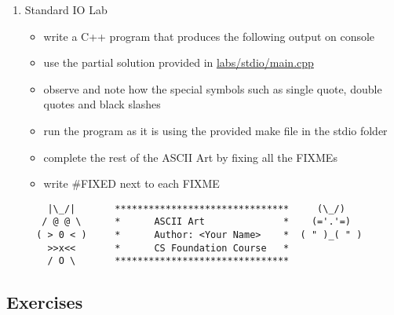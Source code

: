 \documentclass[11pt]{article}
\providecommand{\tightlist}{%
      \setlength{\itemsep}{0pt}\setlength{\parskip}{0pt}}
\begin{document}
\begin{enumerate}
\def\labelenumi{\arabic{enumi}.}
\tightlist
\item
  Standard IO Lab

  \begin{itemize}
  \tightlist
  \item
    write a C++ program that produces the following output on console
  \item
    use the partial solution provided in \url{labs/stdio/main.cpp}
  \item
    observe and note how the special symbols such as single quote,
    double quotes and black slashes
  \item
    run the program as it is using the provided make file in the stdio
    folder
  \item
    complete the rest of the ASCII Art by fixing all the FIXMEs
  \item
    write \#FIXED next to each FIXME
  \end{itemize}

\begin{verbatim}
    |\_/|       *******************************     (\_/)
   / @ @ \      *      ASCII Art              *    (='.'=)
  ( > 0 < )     *      Author: <Your Name>    *  ( " )_( " )
    >>x<<       *      CS Foundation Course   *
    / O \       *******************************
\end{verbatim}
\end{enumerate}

    \hypertarget{exercises}{%
\subsection{Exercises}\label{exercises}}
\end{document}
